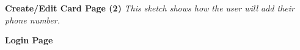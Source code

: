 \documentclass[12pt]{article}%
\begin{document}
\begin{center}
    \clearpage
    {\bf \Large Create/Edit Card Page (2)}
    {\it This sketch shows how the user will add their phone number.}
    
    \clearpage
    {\bf \Large Login Page}
    

\end{center}
\end{document}

